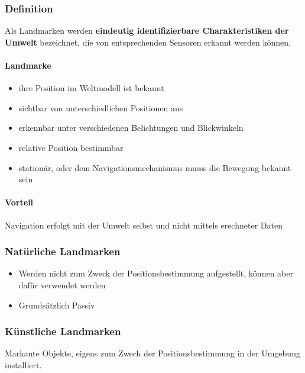 \subsubsection*{Definition}
Als Landmarken werden \textbf{eindeutig identifizierbare Charakteristiken der
Umwelt} bezeichnet, die von entsprechenden Sensoren erkannt werden können.

\paragraph{Landmarke}
\begin{itemize}
	\item ihre Position im Weltmodell ist bekannt
	\item sichtbar von unterschiedlichen Positionen aus
	\item erkennbar unter verschiedenen Belichtungen und Blickwinkeln
	\item relative Position bestimmbar
	\item stationär, oder dem Navigationsmechanismus musss die Bewegung bekannt
		sein
\end{itemize}

\paragraph{Vorteil} Navigation erfolgt mit der Umwelt selbst und nicht mittels
erechneter Daten

\subsubsection*{Natürliche Landmarken}
\begin{itemize}
	\item Werden nicht zum Zweck der Positionsbestimmung aufgestellt, können
		aber dafür verwendet werden
	\item Grundsätzlich Passiv
\end{itemize}

\subsubsection*{Künstliche Landmarken}
Markante Objekte, eigens zum Zwech der Positionsbestimmung in der Umgebung
installiert.
